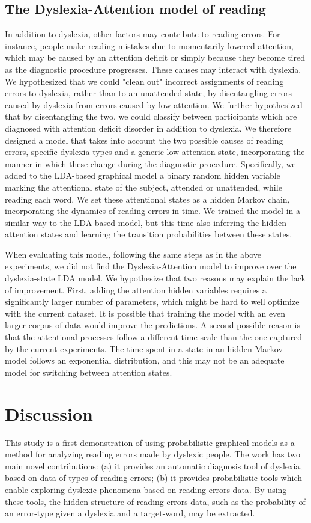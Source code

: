 {{{\subsection{The Dyslexia-Attention model of reading}
In addition to dyslexia, other factors may contribute to reading errors. For instance, people make reading mistakes due to momentarily lowered attention, which may be caused by an attention deficit or simply because they become tired as the diagnostic procedure progresses. These causes may interact with dyslexia. We hypothesized that we could "clean out" incorrect assignments of reading errors to dyslexia, rath\-er than to an unattended state, by disentangling errors caus\-ed by dyslexia from errors caused by low attention. We further hypothesized that by disentangling the two, we could classify between participants which are diagnosed with attention deficit disorder in addition to dyslexia. We therefore designed a model that takes into account the two possible causes of reading errors, specific dyslexia types and a generic low attention state, incorporating the manner in which these change during the diagnostic procedure. Specifically, we added to the LDA-based graphical model a binary random hidden variable marking the attentional state of the subject, attended or unattended, while reading each word. We set these attentional states as a hidden Markov chain, incorporating the dynamics of reading errors in time. We trained the model in a similar way to the LDA-based model, but this time also inferring the hidden attention states and learning the transition probabilities between these states.

When evaluating this model, following the same steps as in the above experiments, we did not find the Dyslexia-Attention model to improve over the dyslexia-state LDA model. We hypothesize that two reasons may explain the lack of improvement. First, adding the attention hidden variables requires a significantly larger number of parameters, which might be hard to well optimize with the current dataset. It is possible that training the model with an even larger corpus of data would improve the predictions. A second possible reason is that the attentional processes follow a different time scale than the one captured by the current experiments. The time spent in a state in an hidden Markov model follows an exponential distribution, and this may not be an adequate model for switching between attention states. 

\section{Discussion}
This study is a first demonstration of using probabilistic graphical models as a method for analyzing reading errors made by dyslexic people. The work has two main novel contributions: (a) it provides an automatic diagnosis tool of dyslexia, based on data of types of reading errors; (b) it provides probabilistic tools which enable exploring dyslexic phenomena based on reading errors data. By using these tools, the hidden structure of reading errors data, such as the probability of an error-type given a dyslexia and a target-word, may be extracted.

}}}
